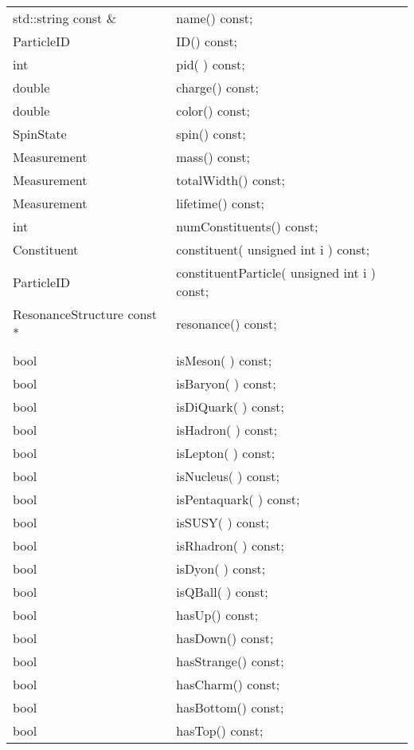 \begin{center}
\begin{tabular}{ll}
  std::string const \&         & name()        const;  \\    
  ParticleID                  & ID()          const; \\
  int                         & pid( )        const; \\
  double                      & charge()      const; \\
  double                      & color()       const; \\
  SpinState                   & spin()        const; \\
  Measurement                 & mass()        const; \\
  Measurement                 & totalWidth()  const; \\
  Measurement                 & lifetime()    const; \\
  int                         & numConstituents() const; \\
   Constituent          & constituent( unsigned int i ) const; \\
   ParticleID           & constituentParticle( unsigned int i ) const; \\
  ResonanceStructure const *  & resonance()   const; \\
 \\
  bool & isMeson( )   const; \\
  bool & isBaryon( )  const; \\
  bool & isDiQuark( ) const; \\
  bool & isHadron( )  const; \\
  bool & isLepton( )  const; \\
  bool & isNucleus( ) const; \\
  bool & isPentaquark( )  const; \\
  bool & isSUSY( )  const; \\
  bool & isRhadron( )  const; \\
  bool & isDyon( )  const; \\
  bool & isQBall( )  const; \\
  bool & hasUp()      const; \\
  bool & hasDown()    const; \\
  bool & hasStrange() const; \\
  bool & hasCharm()   const; \\
  bool & hasBottom()  const; \\
  bool & hasTop()     const; \\

\end{tabular}
\end{center}
